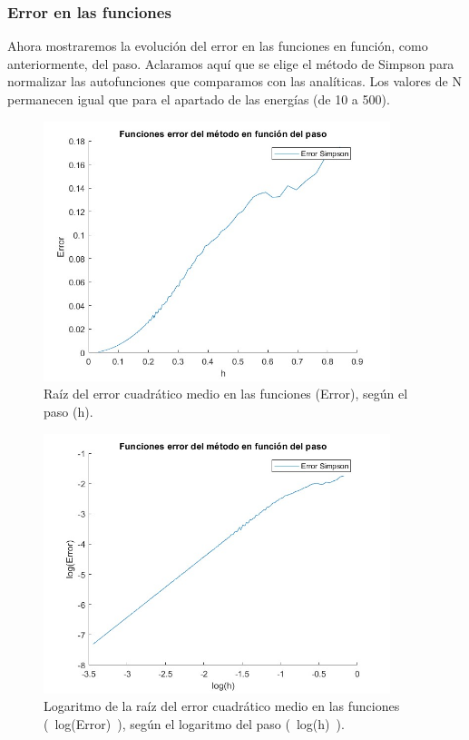 \documentclass[12pt]{article}
\begin{document}
     \subsubsection{Error en las funciones}

    Ahora mostraremos la evolución del error en las funciones en función, como anteriormente, del paso. Aclaramos aquí que se elige el método de Simpson para normalizar las autofunciones que comparamos con las analíticas. Los valores de N permanecen igual que para el apartado de las energías (de 10 a 500).
        
    \begin{figure}[H]
        \centering
        \includegraphics[width=0.9\textwidth]{errorfuncionsegunpaso500N.jpg}
        \caption{Raíz del error cuadrático medio en las funciones (Error), según el paso (h).}
        \end{figure} 
        
    \begin{figure}[H]
        \centering
        \includegraphics[width=0.9\textwidth]{errorfuncionsegunpasoN500log.jpg}
        \caption{Logaritmo de la raíz del error cuadrático medio en las funciones (~log(Error)~), según el  logaritmo del paso (~log(h)~).}
        \end{figure}  
        
\end{document}
